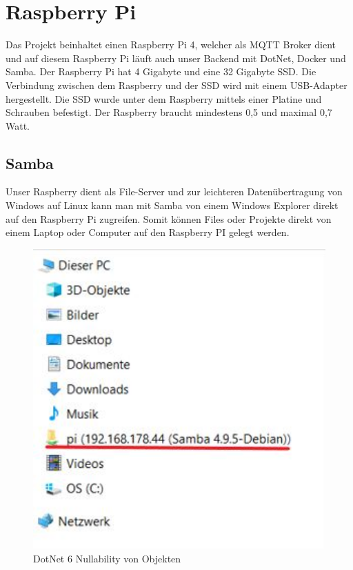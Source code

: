 \section{Raspberry Pi}

Das Projekt beinhaltet einen Raspberry Pi 4, welcher als MQTT Broker dient und auf diesem Raspberry Pi läuft auch unser Backend mit DotNet, Docker und Samba.
Der Raspberry Pi hat 4 Gigabyte und eine 32 Gigabyte SSD. 
Die Verbindung zwischen dem Raspberry und der SSD wird mit einem USB-Adapter hergestellt. 
Die SSD wurde unter dem Raspberry mittels einer Platine und Schrauben befestigt. 
Der Raspberry braucht mindestens 0,5 und maximal 0,7 Watt. 
\subsection{Samba}
Unser Raspberry dient als File-Server und zur leichteren Datenübertragung von Windows auf Linux kann man mit Samba von einem Windows Explorer direkt auf den Raspberry Pi zugreifen.
Somit können Files oder Projekte direkt von einem Laptop oder Computer auf den Raspberry PI gelegt werden.

\begin{figure}[H]
    \centering
    \includegraphics[width=1\textwidth]{pics/RaspberrySamba.JPG}
    \caption{DotNet 6 Nullability von Objekten}
\end{figure}




